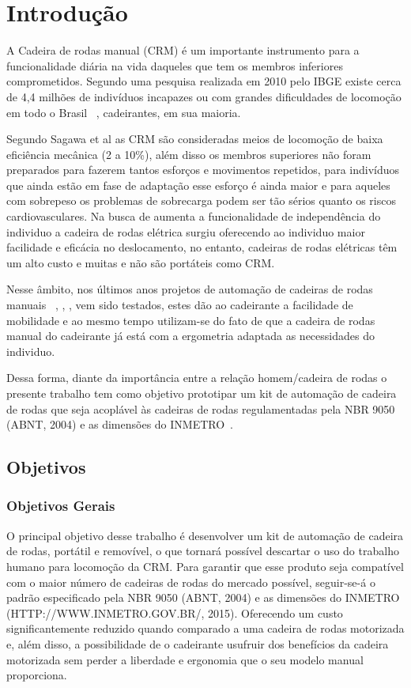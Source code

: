 \chapter[Introdução]{Introdução}

A Cadeira de rodas manual (CRM) é um importante instrumento para a funcionalidade diária na vida daqueles que tem os membros inferiores comprometidos. Segundo uma pesquisa realizada em 2010 pelo IBGE existe cerca de 4,4 milhões de indivíduos incapazes ou com grandes dificuldades de locomoção em todo o Brasil ~\cite{ibge:cartilha:2010}, cadeirantes, em sua maioria.

Segundo Sagawa et al  as CRM são consideradas meios de locomoção de baixa eficiência mecânica (2 a 10\%), além disso os membros superiores não foram preparados para fazerem tantos esforços e movimentos repetidos,  para indivíduos que ainda estão em fase de adaptação esse esforço é ainda maior e para aqueles com sobrepeso os problemas de sobrecarga podem ser tão sérios quanto os riscos cardiovasculares.
Na busca de aumenta a funcionalidade de independência do individuo a cadeira de rodas elétrica surgiu oferecendo ao individuo maior facilidade e eficácia no deslocamento, no entanto, cadeiras de rodas elétricas têm um alto custo e muitas e não são portáteis como CRM.

Nesse âmbito, nos últimos anos projetos de automação de cadeiras de rodas manuais ~\cite{brunel:wheelchair:2004}, \cite{artigo_rudi}, \cite{patent_cadeira_rodas_eletrica},	 \cite{marcos:controle:2002}  vem sido testados, estes dão ao cadeirante a facilidade de mobilidade  e ao mesmo tempo utilizam-se do fato de que a cadeira de rodas manual do cadeirante já está com a ergometria  adaptada as necessidades do individuo.

Dessa forma, diante da importância entre a relação homem/cadeira de rodas o presente trabalho tem como objetivo prototipar um kit de automação de cadeira de rodas que seja acoplável às cadeiras de rodas regulamentadas pela NBR 9050 (ABNT, 2004) e as dimensões do INMETRO~\cite{inmetro}.

\section{Objetivos}
\subsection{Objetivos Gerais}

O principal objetivo desse trabalho é desenvolver um kit de automação de cadeira de rodas, portátil e removível, o que tornará possível descartar o uso do trabalho humano para locomoção da CRM. Para garantir que esse produto seja compatível com o maior número de cadeiras de rodas do mercado possível, seguir-se-á o padrão especificado pela NBR 9050 (ABNT, 2004) e as dimensões do INMETRO (HTTP://WWW.INMETRO.GOV.BR/, 2015). Oferecendo um custo significantemente reduzido quando comparado a uma cadeira de rodas motorizada e, além disso, a possibilidade de o cadeirante usufruir dos benefícios da cadeira motorizada sem perder a liberdade e ergonomia que o seu modelo manual proporciona.

